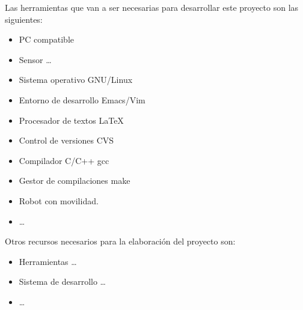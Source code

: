 Las herramientas que van a ser necesarias para desarrollar este proyecto
son las siguientes:

\begin{itemize}
\item PC compatible
\item Sensor  \ldots
\item Sistema operativo GNU/Linux~\cite{gnulinux}
\item Entorno de desarrollo Emacs/Vim~\cite{emacs}
\item Procesador de textos \LaTeX~\cite{lamport94}
\item Control de versiones CVS~\cite{cvs}
\item Compilador C/C++ gcc~\cite{gcc}
\item Gestor de compilaciones make~\cite{make}
\item Robot con movilidad.
\item  \ldots
\end{itemize}



Otros recursos necesarios para la elaboración del proyecto son:

\begin{itemize}
\item Herramientas  \ldots
\item Sistema de desarrollo  \ldots
\item  \ldots
\end{itemize}




% 







